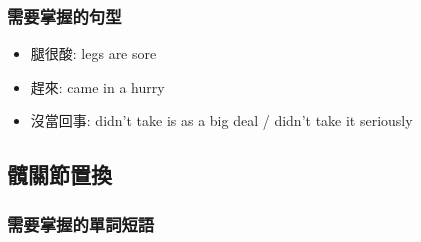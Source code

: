 \subsubsection*{需要掌握的句型}
\begin{itemize}
  \itemsep0em
  \item 腿很酸: legs are sore
  \item 趕來: came in a hurry
  \item 沒當回事: didn't take is as a big deal / didn't take it seriously
\end{itemize}

\subsection{髖關節置換}
\subsubsection*{需要掌握的單詞短語}
